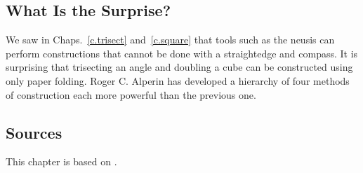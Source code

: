 \newpage

\subsection*{What Is the Surprise?}

We saw in Chaps.~\ref{c.trisect} and~\ref{c.square} that tools such as the neusis can perform constructions that cannot be done with a straightedge and compass. It is surprising that trisecting an angle and doubling a cube can be constructed using only paper folding. Roger C. Alperin has developed a hierarchy of four methods of construction each more powerful than the previous one.

\subsection*{Sources}

This chapter is based on \cite{alperin,lang,martin,newton}.

